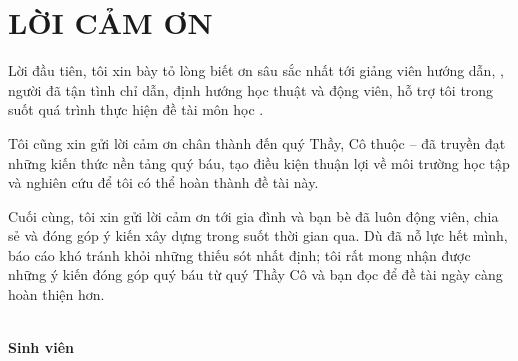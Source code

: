 \chapter*{LỜI CẢM ƠN}

Lời đầu tiên, tôi xin bày tỏ lòng biết ơn sâu sắc nhất tới giảng viên hướng dẫn, \textbf{\InstructorName}, người đã tận tình chỉ dẫn, định hướng học thuật và động viên, hỗ trợ tôi trong suốt quá trình thực hiện đề tài môn học \textbf{\CourseName}.

Tôi cũng xin gửi lời cảm ơn chân thành đến quý Thầy, Cô thuộc \textbf{\InstituteName} -- \textbf{\UnivName} đã truyền đạt những kiến thức nền tảng quý báu, tạo điều kiện thuận lợi về môi trường học tập và nghiên cứu để tôi có thể hoàn thành đề tài này.

Cuối cùng, tôi xin gửi lời cảm ơn tới gia đình và bạn bè đã luôn động viên, chia sẻ và đóng góp ý kiến xây dựng trong suốt thời gian qua. Dù đã nỗ lực hết mình, báo cáo khó tránh khỏi những thiếu sót nhất định; tôi rất mong nhận được những ý kiến đóng góp quý báu từ quý Thầy Cô và bạn đọc để đề tài ngày càng hoàn thiện hơn.

\vspace{1.5cm}
\begin{flushright}
    \textit{\LocationDate}\\[0.3cm]
    \textbf{Sinh viên}\\[2cm]
    \textit{\StudentName}
\end{flushright}
